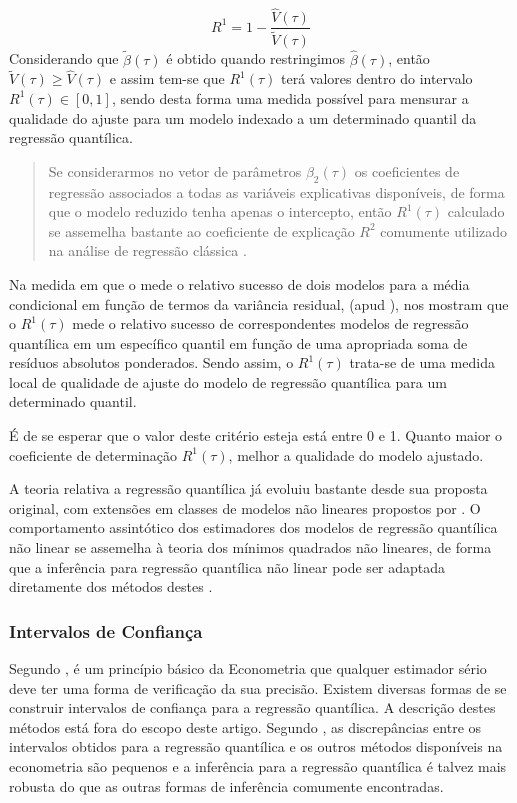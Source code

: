 \documentclass[a4paper, 12pt]{article}
\begin{document}
\[R^1 = 1 - \frac{\hat V(\tau)}{\tilde V(\tau)}\] Considerando que
\(\tilde \beta(\tau)\) é obtido quando restringimos
\(\hat \beta(\tau)\), então \(\tilde V(\tau) \geq \hat V(\tau)\) e assim
tem-se que \(R^1 (\tau)\) terá valores dentro do intervalo
\(R^1(\tau) \in [0,1]\), sendo desta forma uma medida possível para
mensurar a qualidade do ajuste para um modelo indexado a um determinado
quantil da regressão quantílica.

\begin{quote}
Se considerarmos no vetor de parâmetros \(\beta_2(\tau)\) os
coeficientes de regressão associados a todas as variáveis explicativas
disponíveis, de forma que o modelo reduzido tenha apenas o intercepto,
então \(R^1(\tau)\) calculado se assemelha bastante ao coeficiente de
explicação \(R^2\) comumente utilizado na análise de regressão clássica
\autocite{santos2012}.
\end{quote}

Na medida em que o mede o relativo sucesso de dois modelos para a média
condicional em função de termos da variância residual, \textcite{r1}
(apud \textcite{santos2012}), nos mostram que o \(R^1(\tau)\) mede o
relativo sucesso de correspondentes modelos de regressão quantílica em
um específico quantil em função de uma apropriada soma de resíduos
absolutos ponderados. Sendo assim, o \(R^1(\tau)\) trata-se de uma
medida local de qualidade de ajuste do modelo de regressão quantílica
para um determinado quantil.

É de se esperar que o valor deste critério esteja está entre 0 e 1.
Quanto maior o coeficiente de determinação \(R^1(\tau)\), melhor a
qualidade do modelo ajustado.

A teoria relativa a regressão quantílica já evoluiu bastante desde sua
proposta original, com extensões em classes de modelos não lineares
propostos por \textcite{nlqr}. O comportamento assintótico dos
estimadores dos modelos de regressão quantílica não linear se assemelha
à teoria dos mínimos quadrados não lineares, de forma que a inferência
para regressão quantílica não linear pode ser adaptada diretamente dos
métodos destes \autocite{koenker_2005}.

\hypertarget{intervalos-de-confianca}{%
\subsubsection{Intervalos de Confiança}\label{intervalos-de-confianca}}

Segundo \textcite{qr}, é um princípio básico da Econometria que qualquer
estimador sério deve ter uma forma de verificação da sua precisão.
Existem diversas formas de se construir intervalos de confiança para a
regressão quantílica. A descrição destes métodos está fora do escopo
deste artigo. Segundo \textcite[p.~153]{qr}, as discrepâncias entre os
intervalos obtidos para a regressão quantílica e os outros métodos
disponíveis na econometria são pequenos e a inferência para a regressão
quantílica é talvez mais robusta do que as outras formas de inferência
comumente encontradas.
\end{document}
